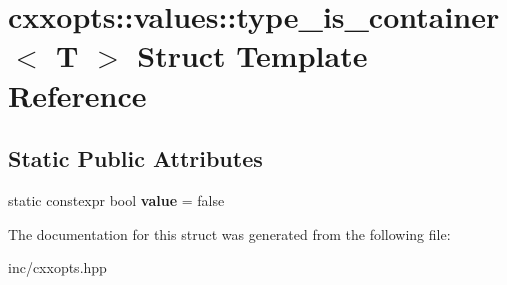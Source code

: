 \hypertarget{structcxxopts_1_1values_1_1type__is__container}{}\section{cxxopts\+:\+:values\+:\+:type\+\_\+is\+\_\+container$<$ T $>$ Struct Template Reference}
\label{structcxxopts_1_1values_1_1type__is__container}
\subsection*{Static Public Attributes}
\begin{DoxyCompactItemize}
\item 
static constexpr bool {\bfseries value} = false\hypertarget{structcxxopts_1_1values_1_1type__is__container_a7f4d1663c787047542c5033e6d3096f9}{}\label{structcxxopts_1_1values_1_1type__is__container_a7f4d1663c787047542c5033e6d3096f9}

\end{DoxyCompactItemize}


The documentation for this struct was generated from the following file\+:\begin{DoxyCompactItemize}
\item 
inc/cxxopts.\+hpp\end{DoxyCompactItemize}
